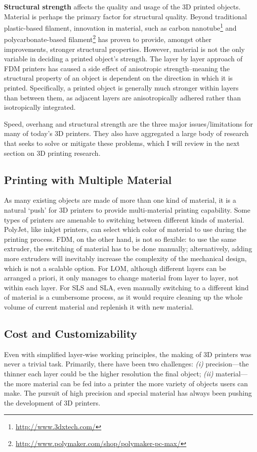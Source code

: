 \textbf{Structural strength} affects the quality and usage of the 3D printed objects. Material is perhaps the primary factor for structural quality. Beyond traditional plastic-based filament, innovation in material, such as carbon nanotube\footnote{\url{http://www.3dxtech.com/}} and polycarbonate-based filament\footnote{\url{http://www.polymaker.com/shop/polymaker-pc-max/}} has proven to provide, amongst other improvements, stronger structural properties. However, material is not the only variable in deciding a printed object's strength. The layer by layer approach of FDM printers has caused a side effect of anisotropic strength--meaning the structural property of an object is dependent on the direction in which it is printed. Specifically, a printed object is generally much stronger within layers than between them, as adjacent layers are anisotropically adhered rather than isotropically integrated. 

Speed, overhang and structural strength are the three major issues/limitations for many of today's 3D printers. They also have aggregated a large body of research that seeks to solve or mitigate these problems, which I will review in the next section on 3D printing research.

\subsection{Printing with Multiple Material}
As many existing objects are made of more than one kind of material, it is a natural `push' for 3D printers to provide multi-material printing capability. Some types of printers are amenable to switching between different kinds of material. PolyJet, like inkjet printers, can select which color of material to use during the printing process. FDM, on the other hand, is not so flexible: to use the same extruder, the switching of material has to be done manually; alternatively, adding more extruders will inevitably increase the complexity of the mechanical design, which is not a scalable option. For LOM, although different layers can be arranged a priori, it only manages to change material from layer to layer, not within each layer. For SLS and SLA, even manually switching to a different kind of material is a cumbersome process, as it would require cleaning up the whole volume of current material and replenish it with new material.

\subsection{Cost and Customizability}
Even with simplified layer-wise working principles, the making of 3D printers was never a trivial task. Primarily, there have been two challenges: {\em (i)} precision---the thinner each layer could be the higher resolution the final object; {\em (ii)} material---the more material can be fed into a printer the more variety of objects users can make. The pursuit of high precision and special material has always been pushing the development of 3D printers.

